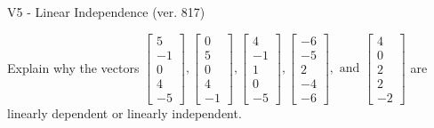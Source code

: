 \begin{exercise}
  \begin{exerciseTitle}V5 - Linear Independence (ver. 817)\end{exerciseTitle}
  \begin{exerciseStatement}
    Explain why the vectors \(\left[\begin{array}{r}
5 \\
-1 \\
0 \\
4 \\
-5
\end{array}\right] , \left[\begin{array}{r}
0 \\
5 \\
0 \\
4 \\
-1
\end{array}\right] , \left[\begin{array}{r}
4 \\
-1 \\
1 \\
0 \\
-5
\end{array}\right] , \left[\begin{array}{r}
-6 \\
-5 \\
2 \\
-4 \\
-6
\end{array}\right] , \text{ and } \left[\begin{array}{r}
4 \\
0 \\
2 \\
2 \\
-2
\end{array}\right]\) are linearly dependent or linearly independent.	



\end{exerciseStatement}
\end{exercise}
